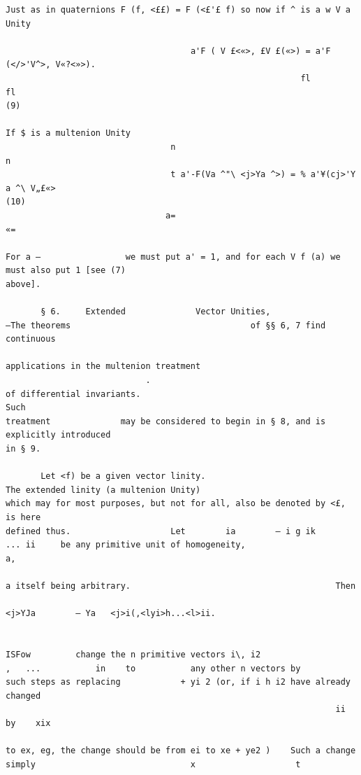 \documentclass[10pt]{article}
\begin{document}
\begin{verbatim}
Just as in quaternions F (f, <££) = F (<£'£ f) so now if ^ is a w V a Unity

                                     a'F ( V £<«>, £V £(«>) = a'F (</>'V^>, V«?<»>).
                                                           fl                fl                                                                                                      (9)

If $ is a multenion Unity
                                 n                                                           n
                                 t a'-F(Va ^"\ <j>Ya ^>) = % a'¥(cj>'Y a ^\ V„£«>                                                                                                   (10)
                                a=                                                         «=

For a —                 we must put a' = 1, and for each V f (a) we must also put 1 [see (7)
above].

       § 6.     Extended              Vector Unities,                         —The theorems                                    of §§ 6, 7 find continuous

applications in the multenion treatment
                            .                                                                       of differential invariants.                                              Such
treatment              may be considered to begin in § 8, and is explicitly introduced
in § 9.

       Let <f) be a given vector linity.                                                The extended linity (a multenion Unity)
which may for most purposes, but not for all, also be denoted by <£, is here
defined thus.                    Let        ia        — i g ik          ... ii     be any primitive unit of homogeneity,                                                              a,

a itself being arbitrary.                                         Then
                                                                    <j>YJa        — Ya   <j>i(,<lyi>h...<l>ii.


ISFow         change the n primitive vectors i\, i2                                                     ,   ...           in    to           any other n vectors by
such steps as replacing            + yi 2 (or, if i h i2 have already changed
                                                                  ii    by    xix

to ex, eg, the change should be from ei to xe + ye2 )    Such a change simply                               x                    t





\end{verbatim}
\end{document}
